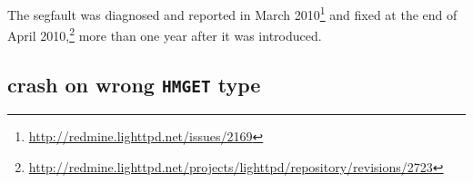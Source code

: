 The segfault was diagnosed and reported in March
2010\footnote{\url{http://redmine.lighttpd.net/issues/2169}} and fixed
at the end of April
2010,\footnote{\url{http://redmine.lighttpd.net/projects/lighttpd/repository/revisions/2723}}
more than one year after it was introduced.  



\subsection{\redis crash on wrong \texttt{HMGET} type}

